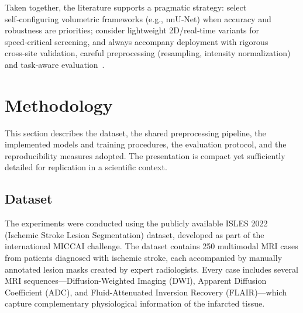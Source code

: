 \documentclass[12pt]{article}
\begin{document}
Taken together, the literature supports a pragmatic strategy: select self‑configuring volumetric frameworks (e.g., nnU‑Net) when accuracy and robustness are priorities; consider lightweight 2D/real‑time variants for speed‑critical screening, and always accompany deployment with rigorous cross‑site validation, careful preprocessing (resampling, intensity normalization) and task‑aware evaluation~\cite{Isensee2021,liFullyConvolutionalNetwork2018,Menze2015}.


\section{Methodology}\label{sec:methodology}

This section describes the dataset, the shared preprocessing pipeline, the implemented models and training procedures, the evaluation protocol, and the reproducibility measures adopted. The presentation is compact yet sufficiently detailed for replication in a scientific context.

\subsection{Dataset}\label{subsec:dataset}

The experiments were conducted using the publicly available ISLES 2022~\cite{liewLargeCuratedOpensource2021} (Ischemic Stroke Lesion Segmentation) dataset, developed as part of the international MICCAI challenge. The dataset contains 250 multimodal MRI cases from patients diagnosed with ischemic stroke, each accompanied by manually annotated lesion masks created by expert radiologists. Every case includes several MRI sequences—Dif\-fusion-Weighted Imaging (DWI), Apparent Diffusion Coefficient (ADC), and Fluid-Attenua\-ted Inversion Recovery (FLAIR)—which capture complementary physiological information of the infarcted tissue.
\end{document}
